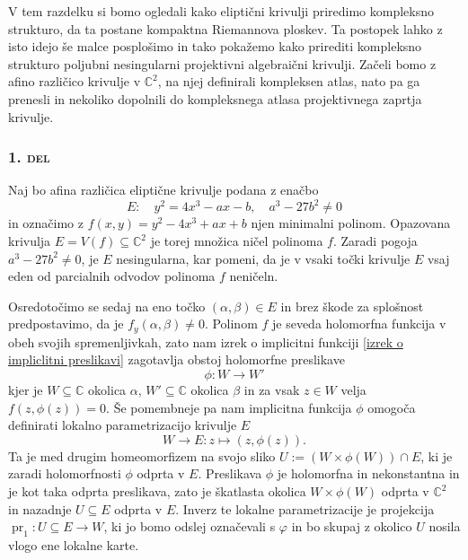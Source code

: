 \documentclass[mat1]{fmfdelo}
\numberwithin{equation}{section}
\newcommand{\C}{\mathbb C}
\DeclareMathOperator{\pr}{pr}
\theoremstyle{definition}
\begin{document}
V tem razdelku si bomo ogledali kako eliptični krivulji 
priredimo kompleksno strukturo, da ta postane kompaktna Riemannova ploskev. Ta postopek lahko z isto idejo še malce posplošimo in tako pokažemo kako prirediti kompleksno strukturo poljubni nesingularni projektivni algebraični krivulji. Začeli bomo z afino različico krivulje v $\C^2$, na njej definirali kompleksen atlas, nato pa ga prenesli in nekoliko dopolnili do kompleksnega atlasa projektivnega zaprtja krivulje.


\subsubsection*{\textsc{1. del}}
Naj bo afina različica eliptične krivulje podana z enačbo
\[
    E: \quad y^2 = 4x^3 - ax - b, \quad a^3 - 27b^2 \neq 0
\]
in označimo z $f(x,y) = y^2 - 4x^3 + ax + b$ njen minimalni polinom. Opazovana krivulja $E = V(f) \subseteq \C^2$ je torej množica ničel polinoma $f$. Zaradi pogoja $a^3 - 27b^2 \neq 0$, je $E$ nesingularna, kar pomeni, da je v vsaki točki krivulje $E$ vsaj eden od parcialnih odvodov polinoma $f$ neničeln. 

Osredotočimo se sedaj na eno točko $(\alpha, \beta) \in E$ in brez škode za splošnost predpostavimo, da je $f_y(\alpha, \beta) \neq 0$. Polinom $f$ je seveda holomorfna funkcija v obeh svojih spremenljivkah, zato nam izrek o implicitni funkciji \ref{izrek o impliclitni preslikavi} zagotavlja obstoj holomorfne preslikave 
\[
    \phi : W \to W'  
\]
kjer je $W \subseteq \C$ okolica $\alpha$, $W' \subseteq \C$ okolica $\beta$ in za vsak $z \in W$ velja $f(z, \phi(z)) = 0$. Še pomembneje pa nam implicitna funkcija $\phi$ omogoča definirati lokalno parametrizacijo krivulje $E$
\[
    W \to E : z \mapsto (z, \phi(z)).
\] 
Ta je med drugim homeomorfizem na svojo sliko $U := (W \times \phi(W)) \cap E$, ki je zaradi holomorfnosti $\phi$ odprta v $E$. Preslikava $\phi$ je holomorfna in nekonstantna in je kot taka odprta preslikava, zato je škatlasta okolica $W \times \phi(W)$ odprta v $\C^2$ in nazadnje $U \subseteq E$ odprta v $E$. Inverz te lokalne parametrizacije je projekcija $\pr_1 : U \subseteq E \to W$, ki jo bomo odslej označevali s $\varphi$ in bo skupaj z okolico $U$ nosila vlogo ene lokalne karte. 

\end{document}
